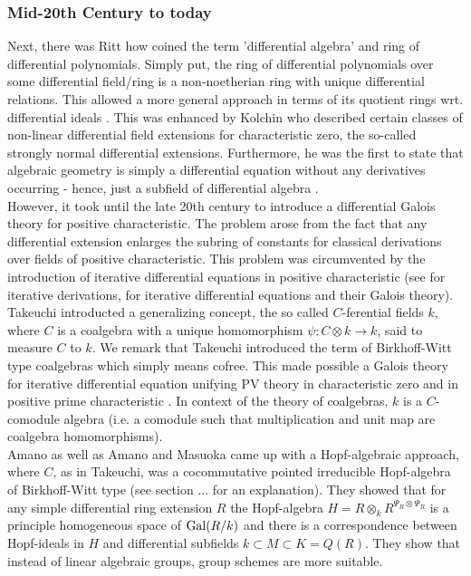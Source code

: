 \subsubsection{Mid-20th Century to today}
Next, there was Ritt how coined the term 'differential algebra' and ring of differential polynomials. Simply put, the ring of differential polynomials over some differential field/ring is a non-noetherian ring with unique differential relations. This allowed a more general approach in terms of its quotient rings wrt. differential ideals \cite{Ritt}. This was enhanced by Kolchin who described certain classes of non-linear differential field extensions for characteristic zero, the so-called strongly normal differential extensions. Furthermore, he was the first to state that algebraic geometry is simply a differential equation without any derivatives occurring - hence, just a subfield of differential algebra \cite{Kol}.\\
\indent However, it took until the late 20th century to introduce a differential Galois theory for positive characteristic. The problem arose from the fact that any differential extension enlarges the subring of constants for classical derivations over fields of positive characteristic. %
This problem was circumvented by the introduction of iterative differential equations in positive characteristic (see \cite{HassSchm} for iterative derivations, \cite{Matz} for iterative differential equations and their Galois theory).\\
\indent Takeuchi introducted a generalizing concept, the so called $C$-ferential fields $k$, where $C$ is a coalgebra with a unique homomorphism $\psi : C \otimes k \longrightarrow k$, said to measure $C$ to $k$. We remark that Takeuchi introduced the term of Birkhoff-Witt type coalgebras which simply means cofree. This made possible a Galois theory for iterative differential equation unifying PV theory in characteristic zero and in positive prime characteristic \cite{Take}. In context of the theory of coalgebras, $k$ is a $C$-comodule algebra (i.e. a comodule such that multiplication and unit map are coalgebra homomorphisms).\\
\indent Amano \cite{AM} as well as Amano and Masuoka \cite{Amo} came up with a Hopf-algebraic approach, where $C$, as in Takeuchi, was a cocommutative pointed irreducible Hopf-algebra of Birkhoff-Witt type (see section ... for an explanation). They showed that for any simple differential ring extension $R$ the Hopf-algebra $H = R \otimes_k R^{\Psi_R \otimes \Psi_R}$ is a principle homogeneous space of $\mathrm{Gal}(R/k)$ and there is a correspondence between Hopf-ideals in $H$ and differential subfields $k \subset M \subset K = Q(R)$. They show that instead of linear algebraic groups, group schemes are more suitable.